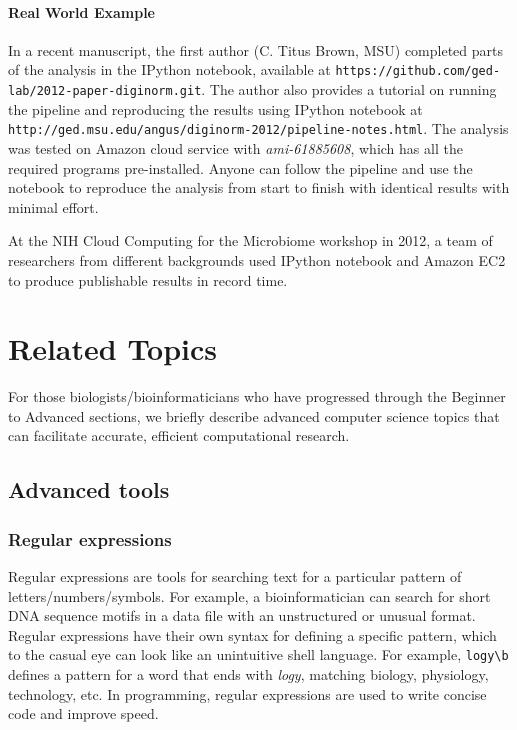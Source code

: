 \documentclass[ChapterTOCs,krantz2]{krantz} %
\begin{document}
\paragraph{Real World Example}

In a recent manuscript, the first author (C. Titus Brown, MSU) completed parts
of the analysis in the IPython notebook, available at
\texttt{https://github.com/ged-lab/2012-paper-diginorm.git}. The author also
provides a tutorial on running the pipeline and reproducing the
results using IPython notebook at
\texttt{http://ged.msu.edu/angus/diginorm-2012/pipeline-notes.html}. 
The analysis was tested on Amazon cloud service with
\emph{ami-61885608}, which has all the required programs pre-installed. Anyone
can follow the pipeline and use the notebook to reproduce the
analysis from start to finish with identical results with minimal effort.

At the NIH Cloud Computing for the Microbiome workshop in 2012, a 
team of researchers from different backgrounds used IPython notebook 
and Amazon EC2 to produce publishable results in record time\cite{RaganKelley2012}.

\section{Related Topics}

For those biologists/bioinformaticians who have progressed through the Beginner
to Advanced sections, we briefly describe advanced computer science topics 
that can facilitate accurate, efficient computational research.

\subsection{Advanced tools}


\subsubsection{Regular expressions}

Regular expressions are tools for
searching text for a particular pattern of letters/numbers/symbols.  For
example, a bioinformatician can search for short DNA sequence motifs in 
a data file with an unstructured or unusual format.  Regular expressions have their own
syntax for defining a specific pattern, which to the casual eye can look like
an unintuitive shell language. For example, \texttt{logy\textbackslash{}b} defines a pattern for a word
that ends with \emph{logy}, matching biology, physiology, technology, etc.
In programming, regular expressions are
used to write concise code and improve speed. 
\end{document}
